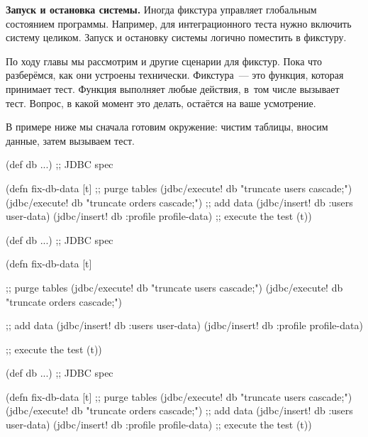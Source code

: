 \textbf{Запуск и остановка системы.} Иногда фикстура управляет глобальным
состоянием программы. Например, для интеграционного теста нужно включить систему
целиком. Запуск и остановку системы логично поместить в фикстуру.

По ходу главы мы рассмотрим и другие сценарии для фикстур. Пока что разберёмся,
как они устроены технически. Фикстура~--- это функция, которая принимает
тест. Функция выполняет любые действия, в~том числе вызывает тест. Вопрос, в
какой момент это делать, остаётся на ваше усмотрение.

В примере ниже мы сначала готовим окружение: чистим таблицы, вносим данные,
затем вызываем тест.


\label{fix-db-data}

\ifnarrow

\begin{english}
  \begin{clojure}
(def db {...}) ;; JDBC spec

(defn fix-db-data [t]
  ;; purge tables
  (jdbc/execute! db
    "truncate users cascade;")
  (jdbc/execute! db
    "truncate orders cascade;")
  ;; add data
  (jdbc/insert! db :users user-data)
  (jdbc/insert! db
    :profile profile-data)
  ;; execute the test
  (t))
  \end{clojure}
\end{english}

\else

\ifafive

\begin{english}
  \begin{clojure}
(def db {...}) ;; JDBC spec

(defn fix-db-data [t]

  ;; purge tables
  (jdbc/execute! db "truncate users cascade;")
  (jdbc/execute! db "truncate orders cascade;")

  ;; add data
  (jdbc/insert! db :users user-data)
  (jdbc/insert! db :profile profile-data)

  ;; execute the test
  (t))
  \end{clojure}
\end{english}

\else

\begin{english}
  \begin{clojure}
(def db {...}) ;; JDBC spec

(defn fix-db-data [t]
  ;; purge tables
  (jdbc/execute! db "truncate users cascade;")
  (jdbc/execute! db "truncate orders cascade;")
  ;; add data
  (jdbc/insert! db :users user-data)
  (jdbc/insert! db :profile profile-data)
  ;; execute the test
  (t))
  \end{clojure}
\end{english}

